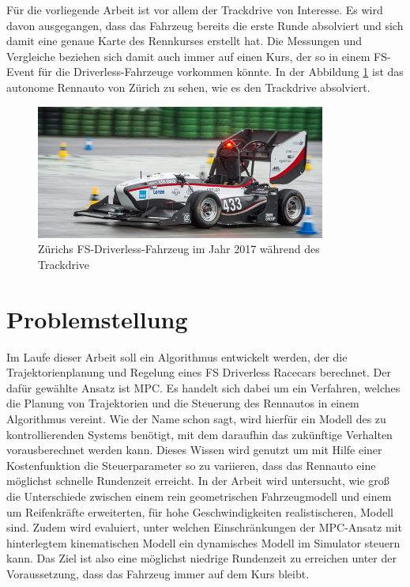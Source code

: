 \documentclass{like}
\begin{document}
Für die vorliegende Arbeit ist vor allem der Trackdrive von Interesse. Es wird davon ausgegangen, dass das Fahrzeug bereits die erste Runde absolviert und sich damit eine genaue Karte des Rennkurses erstellt hat. Die Messungen und Vergleiche beziehen sich damit auch immer auf einen Kurs, der so in einem \ac{FS}-Event für die Driverless-Fahrzeuge vorkommen könnte. 
In der Abbildung \ref{fig:zurichDriverless} ist das autonome Rennauto von Zürich zu sehen, wie es den Trackdrive absolviert.
\begin{figure}[hb!]
	\centering
	\includegraphics[width=270pt]{Abbildungen/amz-driverless-long.jpg}
	\caption{Zürichs \ac{FS}-Driverless-Fahrzeug im Jahr 2017 während des Trackdrive}
	\label{fig:zurichDriverless}
\end{figure}

\section{Problemstellung}
Im Laufe dieser Arbeit soll ein Algorithmus entwickelt werden, der die Trajektorienplanung und Regelung eines \ac{FS} Driverless Racecars berechnet. Der dafür gewählte Ansatz ist \ac{MPC}. Es handelt sich dabei um ein Verfahren, welches die Planung von Trajektorien und die Steuerung des Rennautos in einem Algorithmus vereint. Wie der Name schon sagt, wird hierfür ein Modell des zu kontrollierenden Systems benötigt, mit dem daraufhin das zukünftige Verhalten vorausberechnet werden kann. Dieses Wissen wird genutzt um mit Hilfe einer Kostenfunktion die Steuerparameter so zu variieren, dass das Rennauto eine möglichst schnelle Rundenzeit erreicht. In der Arbeit wird untersucht, wie groß die Unterschiede zwischen einem rein geometrischen Fahrzeugmodell und einem um Reifenkräfte erweiterten, für hohe Geschwindigkeiten realistischeren, Modell sind. Zudem wird evaluiert, unter welchen Einschränkungen der \ac{MPC}-Ansatz mit hinterlegtem kinematischen Modell ein dynamisches Modell im Simulator steuern kann. Das Ziel ist also eine möglichst niedrige Rundenzeit zu erreichen unter der Voraussetzung, dass das Fahrzeug immer auf dem Kurs bleibt.
\end{document}

